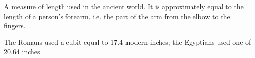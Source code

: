A measure of length used in the ancient world. It is approximately equal to the length
of a person's forearm, i.e. the part of the arm from the elbow to the fingers.
\par
The Romans used a cubit equal to 17.4 modern inches; the Egyptians
used one of 20.64 inches.
